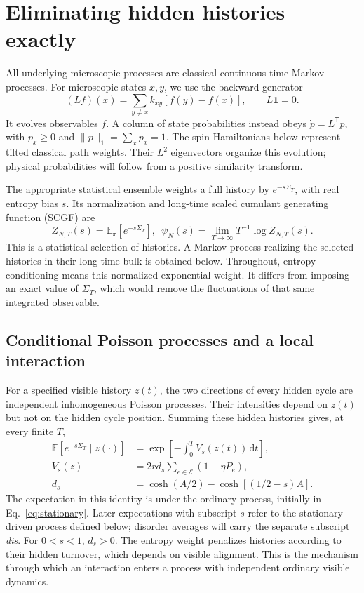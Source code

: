 \documentclass[aps,pre,reprint,amsmath,amssymb,longbibliography,floatfix]{revtex4-2}
\newcommand{\E}{\mathbb E}
\newcommand{\dd}{\,\mathrm d}
\begin{document}
\section{Eliminating hidden histories exactly}
\label{sec:reduction}

All underlying microscopic processes are classical continuous-time Markov
processes. For microscopic states $x,y$, we use the backward generator
\begin{equation}
 (Lf)(x)=\sum_{y\ne x}k_{xy}\left[f(y)-f(x)\right],\qquad L\mathbf1=0.
 \label{eq:backward-convention}
\end{equation}
It evolves observables $f$. A column of state probabilities instead
obeys $\dot p=L^{\mathsf T}p$, with $p_x\ge0$ and
$\|p\|_1=\sum_xp_x=1$. The spin Hamiltonians below represent tilted
classical path weights. Their $L^2$ eigenvectors organize this evolution;
physical probabilities will follow from a positive similarity transform.

The appropriate statistical ensemble weights a full history by
$e^{-s\Sigma_T}$, with real entropy bias $s$. Its normalization and
long-time scaled cumulant generating function (SCGF) are
\begin{equation}
 Z_{N,T}(s)=\E_\pi\left[e^{-s\Sigma_T}\right],\enspace
 \psi_N(s)=\lim_{T\to\infty}T^{-1}\log Z_{N,T}(s).
 \label{eq:scgf}
\end{equation}
This is a statistical selection of histories. A Markov process realizing
the selected histories in their long-time bulk is  obtained below.
Throughout, entropy conditioning means this normalized exponential
weight. It differs from imposing an exact value of $\Sigma_T$, which
would remove the fluctuations of that same integrated observable.

\subsection{Conditional Poisson processes and a local interaction}
For a specified visible history $z(t)$, the two directions of every hidden
cycle are independent inhomogeneous Poisson processes. Their intensities
depend on $z(t)$ but not on the hidden cycle position. Summing these hidden
histories gives, at every finite $T$,
\begin{align}
 \E\left[e^{-s\Sigma_T}\mid z(\cdot)\right]
 &=\exp\left[-\int_0^T V_s(z(t))\dd t\right],\label{eq:conditional}\\
 V_s(z)&=2r d_s\sum_{e\in\mathcal E}(1-\eta P_e),\label{eq:potential}\\
 d_s&=\cosh(A/2)-\cosh\left[(1/2-s)A\right].\label{eq:ds}
\end{align}
The expectation in this identity is under the ordinary process, initially
in Eq.~\eqref{eq:stationary}. Later expectations with subscript $s$
refer to the stationary driven process defined below; disorder averages
will carry the separate subscript \emph{dis}.
For $0<s<1$, $d_s>0$. The entropy weight penalizes histories according to
their hidden turnover, which depends on visible alignment. This is the
mechanism through which an interaction enters a process with independent
ordinary visible dynamics.
\end{document}
